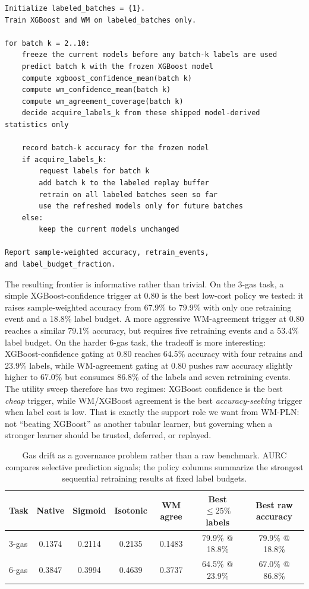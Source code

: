 \documentclass[11pt,openany]{report}
\begin{document}
\begin{lstlisting}[caption={Gas drift governance protocol (shipped confidence/agreement triggers; no lookahead into batch-$k$ labels).},label={lst:gas-governance-protocol}]
Initialize labeled_batches = {1}.
Train XGBoost and WM on labeled_batches only.

for batch k = 2..10:
    freeze the current models before any batch-k labels are used
    predict batch k with the frozen XGBoost model
    compute xgboost_confidence_mean(batch k)
    compute wm_confidence_mean(batch k)
    compute wm_agreement_coverage(batch k)
    decide acquire_labels_k from these shipped model-derived statistics only

    record batch-k accuracy for the frozen model
    if acquire_labels_k:
        request labels for batch k
        add batch k to the labeled replay buffer
        retrain on all labeled batches seen so far
        use the refreshed models only for future batches
    else:
        keep the current models unchanged

Report sample-weighted accuracy, retrain_events,
and label_budget_fraction.
\end{lstlisting}

The resulting frontier is informative rather than trivial.  On the
3-gas task, a simple XGBoost-confidence trigger at 0.80 is the best
low-cost policy we tested: it raises sample-weighted accuracy from
67.9\% to 79.9\% with only one retraining event and a 18.8\% label
budget.  A more aggressive WM-agreement trigger at 0.80 reaches a
similar 79.1\% accuracy, but requires five retraining events and a
53.4\% label budget.  On the harder 6-gas task, the tradeoff is more
interesting: XGBoost-confidence gating at 0.80 reaches 64.5\% accuracy
with four retrains and 23.9\% labels, while WM-agreement gating at 0.80
pushes raw accuracy slightly higher to 67.0\% but consumes 86.8\% of the
labels and seven retraining events.  The utility sweep therefore has two
regimes: XGBoost confidence is the best \emph{cheap} trigger, while
WM/XGBoost agreement is the best \emph{accuracy-seeking} trigger when
label cost is low.  That is exactly the support role we want from
WM-PLN: not ``beating XGBoost'' as another tabular learner, but
governing when a stronger learner should be trusted, deferred, or
replayed.

\begin{table}[htbp]
\centering
\caption{Gas drift as a governance problem rather than a raw benchmark.
  AURC compares selective prediction signals; the policy columns summarize
  the strongest sequential retraining results at fixed label budgets.}
\label{tab:gas-governance-summary}
\begin{tabular}{lcccccc}
\toprule
Task & Native & Sigmoid & Isotonic & WM agree &
Best $\le 25\%$ labels & Best raw accuracy \\
\midrule
3-gas &
0.1374 &
0.2114 &
0.2135 &
0.1483 &
79.9\% @ 18.8\% &
79.9\% @ 18.8\% \\
6-gas &
0.3847 &
0.3994 &
0.4639 &
0.3737 &
64.5\% @ 23.9\% &
67.0\% @ 86.8\% \\
\bottomrule
\end{tabular}
\end{table}
\end{document}
